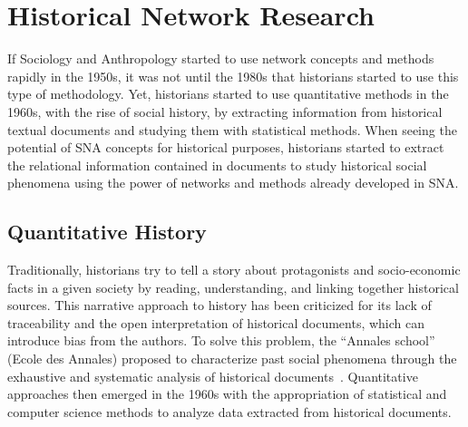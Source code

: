 \section{Historical Network Research}\label{sec:historical-network-research}

If Sociology and Anthropology started to use network concepts and methods rapidly in the 1950s, it was not until the 1980s that historians started to use this type of methodology.
Yet, historians started to use quantitative methods in the 1960s, with the rise of social history, by extracting information from historical textual documents and studying them with statistical methods.
When seeing the potential of SNA concepts for historical purposes, historians started to extract the relational information contained in documents to study historical social phenomena using the power of networks and methods already developed in SNA.

\subsection{Quantitative History}


Traditionally, historians try to tell a story about protagonists and socio-economic facts in a given society by reading, understanding, and linking together historical sources.
This narrative approach to history has been criticized for its lack of traceability and the open interpretation of historical documents, which can introduce bias from the authors.
To solve this problem, the ``Annales school'' (Ecole des Annales) proposed to characterize past social phenomena through the exhaustive and systematic analysis of historical documents~\cite{prost2014}.
Quantitative approaches then emerged in the 1960s with the appropriation of statistical and computer science methods to analyze data extracted from historical documents.

